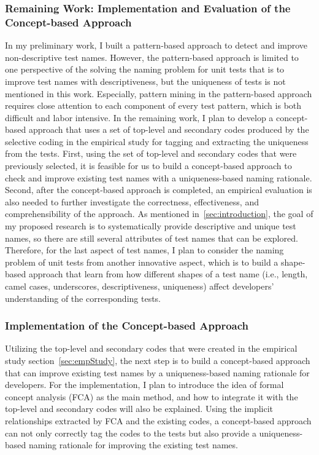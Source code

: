 \subsubsection{Remaining Work: Implementation and Evaluation of the Concept-based Approach}
\label{sec:remaining-work}

In my preliminary work, I built a pattern-based approach to detect and improve non-descriptive test names.
%
However, the pattern-based approach is limited to one perspective of the solving the naming problem for unit tests that is to improve test names with descriptiveness, but the uniqueness of tests is not mentioned in this work.
%
Especially, pattern mining in the pattern-based approach requires close attention to each component of every test pattern, which is both difficult and labor intensive.
%
In the remaining work, I plan to develop a concept-based approach that uses a set of top-level and secondary codes produced by the selective coding in the empirical study for tagging and extracting the uniqueness from the tests.
%
First, using the set of top-level and secondary codes that were previously selected, it is feasible for us to build a concept-based approach to check and improve existing test names with a uniqueness-based naming rationale.
%
Second, after the concept-based approach is completed, an empirical evaluation is also needed to further investigate the correctness, effectiveness, and comprehensibility of the approach.
%
As mentioned in~\cref{sec:introduction}, the goal of my proposed research is to systematically provide descriptive and unique test names, so there are still several attributes of test names that can be explored.
%
Therefore, for the last aspect of test names, I plan to consider the naming problem of unit tests from another innovative aspect, which is to build a shape-based approach that learn from how different shapes of a test name (i.e., length, camel cases, underscores, descriptiveness, uniqueness) affect developers' understanding of the corresponding tests.

\subsubsection{Implementation of the Concept-based Approach}

Utilizing the top-level and secondary codes that were created in the empirical study section~\cref{sec:empStudy}, the next step is to build a concept-based approach that can improve existing test names by a uniqueness-based naming rationale for developers.
%
For the implementation, I plan to introduce the idea of formal concept analysis (FCA) as the main method, and how to integrate it with the top-level and secondary codes will also be explained.
%
Using the implicit relationships extracted by FCA and the existing codes, a concept-based approach can not only correctly tag the codes to the tests but also provide a uniqueness-based naming rationale for improving the existing test names.

